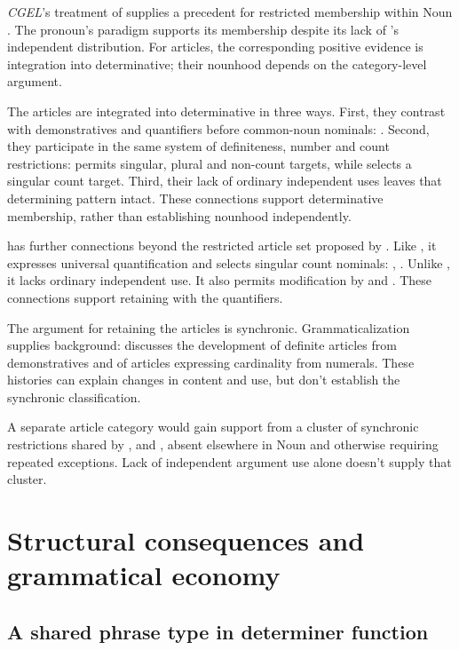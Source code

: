 \documentclass[12pt]{article}
\begin{document}
\textit{CGEL}'s treatment of  supplies a precedent for restricted membership within Noun \citep[470--471]{huddleston2002}. The pronoun's paradigm supports its membership despite its lack of 's independent distribution. For articles, the corresponding positive evidence is integration into determinative; their nounhood depends on the category-level argument.

The articles are integrated into determinative in three ways. First, they contrast with demonstratives and quantifiers before common-noun nominals: . Second, they participate in the same system of definiteness, number and count restrictions:  permits singular, plural and non-count targets, while  selects a singular count target. Third, their lack of ordinary independent uses leaves that determining pattern intact. These connections support determinative membership, rather than establishing nounhood independently.

 has further connections beyond the restricted article set proposed by \textcite{spinillo2004reconceptualising}. Like , it expresses universal quantification and selects singular count nominals: , . Unlike , it lacks ordinary independent use. It also permits modification by  and . These connections support retaining  with the quantifiers.

The argument for retaining the articles is synchronic. Grammaticalization supplies background: \textcite[331--336]{lyons1999} discusses the development of definite articles from demonstratives and of articles expressing cardinality from numerals. These histories can explain changes in content and use, but don't establish the synchronic classification.

A separate article category would gain support from a cluster of synchronic restrictions shared by ,  and , absent elsewhere in Noun and otherwise requiring repeated exceptions. Lack of independent argument use alone doesn't supply that cluster.

\section{Structural consequences and grammatical economy}\label{sec:economy}

\subsection{A shared phrase type in determiner function}\label{sec:det-uniform}
\end{document}
